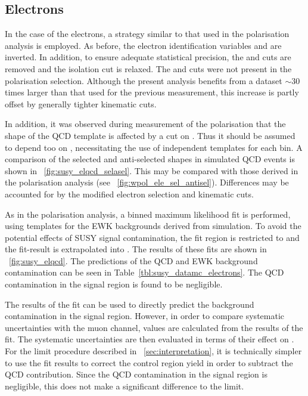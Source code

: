 \subsection{Electrons}
\label{sec:susy_electron_bgpredict}
In the case of the electrons, a strategy similar to that used in the \PW
polarisation analysis is employed. As before, the electron identification
variables \deltaetain and \deltaphiin are inverted. In addition, to ensure
adequate statistical precision, the  and \Dz cuts are removed and the
isolation cut is relaxed. The  and \Dz cuts were not present in the \PW
polarisation selection. Although the present analysis benefits from a dataset
$\sim 30$ times larger than that used for the previous measurement, this
increase is partly offset by generally tighter kinematic cuts.

In addition, it was observed during measurement of the \PW polarisation that the
shape of the QCD template is affected by a cut on \PtW. Thus it should be
assumed to depend too on \STlep, necessitating the use of independent templates
for each \STlep bin. A comparison of the selected and anti-selected shapes in
simulated \ac{QCD} events is shown in \fig~\ref{fig:susy_elqcd_selasel}. This
may be compared with those derived in the \PW polarisation analysis (see
\fig~\ref{fig:wpol_ele_sel_antisel}). Differences may be accounted for by the
modified electron selection and kinematic cuts.

As in the \PW polarisation analysis, a binned maximum likelihood fit is
performed, using templates for the \ac{EWK} backgrounds derived from
simulation. To avoid the potential effects of \ac{SUSY} signal contamination,
the fit region is restricted to \LPcontrol and the fit-result is extrapolated
into \LPsignal. The results of these fits are shown in
\fig~\ref{fig:susy_elqcd}. The predictions of the \ac{QCD} and \ac{EWK}
background contamination can be seen in
Table~\ref{tbl:susy_datamc_electrons}. The \ac{QCD} contamination in the signal
region is found to be negligible.

The results of the fit can be used to directly predict the background
contamination in the signal region. However, in order to compare systematic
uncertainties with the muon channel, \RCS values are calculated from the results
of the fit. The systematic uncertainties are then evaluated in terms of their
effect on \RCS. For the limit procedure described in
\chap~\ref{sec:interpretation}, it is technically simpler to use the fit results
to correct the control region yield in order to subtract the \ac{QCD}
contribution. Since the \ac{QCD} contamination in the signal region is
negligible, this does not make a significant difference to the limit.

